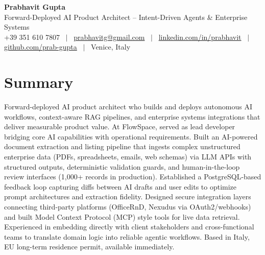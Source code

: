 \documentclass[a4paper,10pt]{article}
\begin{document}

\begin{minipage}[c]{\textwidth}
{\Huge\bfseries Prabhavit Gupta}\\[4pt]
{\color{accent}\large Forward-Deployed AI Product Architect -- Intent-Driven Agents \& Enterprise Systems}\\[5pt]
{\footnotesize +39 351 610 7807 ~$\vert$~
\href{mailto:prabhavitg@gmail.com}{prabhavitg@gmail.com} ~$\vert$~
\href{https://www.linkedin.com/in/prabhavit/}{linkedin.com/in/prabhavit} ~$\vert$~
\href{https://github.com/prab-gupta}{github.com/prab-gupta} ~$\vert$~
Venice, Italy}
\end{minipage}
\vspace{4pt}

\section{Summary}
Forward-deployed AI product architect who builds and deploys autonomous AI workflows, context-aware RAG pipelines, and enterprise systems integrations that deliver measurable product value. At FlowSpace, served as lead developer bridging core AI capabilities with operational requirements. Built an AI-powered document extraction and listing pipeline that ingests complex unstructured enterprise data (PDFs, spreadsheets, emails, web schemas) via LLM APIs with structured outputs, deterministic validation guards, and human-in-the-loop review interfaces (1,000+ records in production). Established a PostgreSQL-based feedback loop capturing diffs between AI drafts and user edits to optimize prompt architectures and extraction fidelity. Designed secure integration layers connecting third-party platforms (OfficeRnD, Nexudus via OAuth2/webhooks) and built Model Context Protocol (MCP) style tools for live data retrieval. Experienced in embedding directly with client stakeholders and cross-functional teams to translate domain logic into reliable agentic workflows. Based in Italy, EU long-term residence permit, available immediately.

\end{document}

